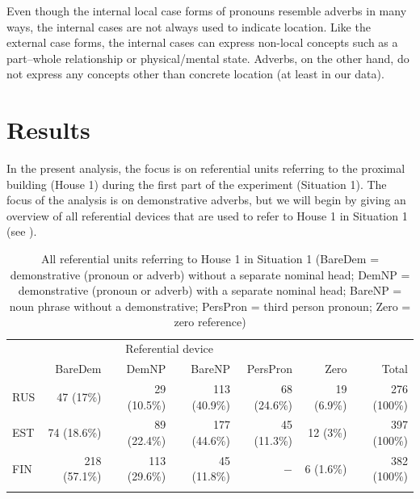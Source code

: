 \documentclass[output=paper,colorlinks,citecolor=brown]{langscibook}
\begin{document}
Even though the internal local case forms of pronouns resemble adverbs in many ways, the internal cases are not always used to indicate location. Like the external case forms, the internal cases can express non-local concepts such as a part–whole relationship or physical/mental state. Adverbs, on the other hand, do not express any concepts other than concrete location (at least in our data).

\section{Results}\label{sec:nahkola:4}

In the present analysis, the focus is on referential units referring to the proximal building (House 1) during the first part of the experiment (Situation 1). The focus of the analysis is on demonstrative adverbs, but we will begin by giving an overview of all referential devices that are used to refer to House 1 in Situation 1 (see ).

\begin{table}
\small
\begin{tabularx}{\textwidth}{Xrrrrrr}
\lsptoprule
\multicolumn{2}{l}{Language} & \multicolumn{4}{c}{{Referential device}}\\
\cmidrule{2-6}
 & {BareDem} & {DemNP} & {BareNP} & {PersPron} & {Zero} & {Total}\\
 \midrule
{RUS} & {47 (17\%)} & {29 (10.5\%)} & {113 (40.9\%)} & {68 (24.6\%)} & {19 (6.9\%)} & {276 (100\%)}\\
{EST} & {74 (18.6\%)} & {89 (22.4\%)} & {177 (44.6\%)} & {45 (11.3\%)} & {12 (3\%)} & {397 (100\%)}\\
{FIN} & {218 (57.1\%)} & {113 (29.6\%)} & {45 (11.8\%)} & {$-$} & {6 (1.6\%)} & {382 (100\%)}\\
\lspbottomrule
\end{tabularx}
\caption{\label{tab:nahkola:2}
All referential units referring to House 1 in Situation 1 (BareDem = demonstrative (pronoun or adverb) without a separate nominal head; DemNP = demonstrative (pronoun or adverb) with a separate nominal head; BareNP = noun phrase without a demonstrative; PersPron = third person pronoun; Zero = zero reference)}
\end{table}
\end{document}
